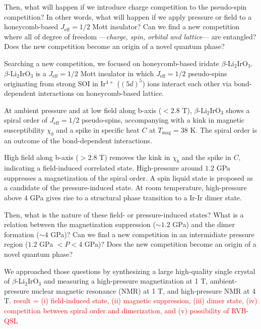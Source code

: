 Then, what will happen if we introduce charge competition to the pseudo-spin competition?
In other words, what will happen if we apply pressure or field to a honeycomb-based $J_\mathrm{eff} = 1/2$ Mott insulator?
Can we find a new competition where all of degree of freedom ---\textit{charge, spin, orbital and lattice}--- are entangled?
Does the new competition become an origin of a novel quantum phase?

\vspace{3mm}
Searching a new competition, we focused on honeycomb-based iridate $\beta$-Li$_2$IrO$_3$.
$\beta$-Li$_2$IrO$_3$ is a $J_\mathrm{eff} = 1/2$ Mott insulator in which $J_\mathrm{eff} = 1/2$ pseudo-spins originating from strong SOI in Ir$^{4+}$ ($(5d)^5$) ions interact each other via bond-dependent interactions on honeycomb-based lattice.

At ambient pressure and at low field along b-axis ($< 2.8$ T), $\beta$-Li$_2$IrO$_3$ shows a spiral order of $J_\mathrm{eff} = 1/2$ pseudo-spins, accompanying with a kink in magnetic susceptibility $\chi_b$ and a spike in specific heat $C$ at $T_\mathrm{mag} = 38$ K.
The spiral order is an outcome of the bond-dependent interactions.

High field along b-axis ($> 2.8$ T) removes the kink in $\chi_b$ and the spike in $C$, indicating a field-induced correlated state.
High-pressure around $1.2$ GPa suppresses a magnetization of the spiral order.
A spin liquid state is proposed as a candidate of the pressure-induced state.
At room temperature, high-pressure above $4$ GPa gives rise to a structural phase transition to a Ir-Ir dimer state.

Then, what is the nature of these field- or pressure-induced states?
What is a relation between the magnetization suppression ($\sim 1.2$ GPa) and the dimer formation ($\sim 4$ GPa)?
Can we find a new competition in an intermidiate pressure region ($1.2$ GPa $< P < 4$ GPa)?
Does the new competition become an origin of a novel quantum phase?

\vspace{3mm}
We approached those questions by synthesizing a large high-quality single crystal of $\beta$-Li$_2$IrO$_3$ and measuring a high-pressure magnetization at 1 T, ambient-pressure nuclear magnetic resonance (NMR) at 1 T, and high-pressure NMR at 4 T.
\textcolor{red}{result = (i) field-induced state, (ii) magnetic suppression, (iii) dimer state, (iv) competition between spiral order and dimerization, and (v) possibility of RVB-QSL}

